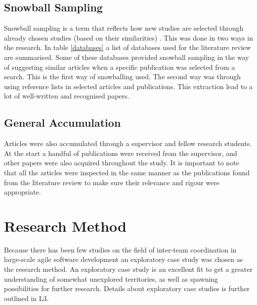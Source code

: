 \subsection{Snowball Sampling}

Snowball sampling is a term that reflects how new studies are selected through already chosen studies (based on their similarities) \cite{Goodman1961}. This was done in two ways in the research. In table \ref{databases} a list of databases used for the literature review are summarised. Some of these databases provided snowball sampling in the way of suggesting similar articles when a specific publication was selected from a search. This is the first way of snowballing used. The second way was through using reference lists in selected articles and publications. This extraction lead to a lot of well-written and recognised papers.

\subsection{General Accumulation}
\label{general}

Articles were also accumulated through a supervisor and fellow research students. At the start a handful of publications were received from the supervisor, and other papers were also acquired throughout the study. It is important to note that all the articles were inspected in the same manner as the publications found from the literature review to make sure their relevance and rigour were appropriate.

\section{Research Method}

Because there has been few studies on the field of inter-team coordination in large-scale agile software development an exploratory case study was chosen as the research method. An exploratory case study is an excellent fit to get a greater understanding of somewhat unexplored territories, as well as spawning possibilities for further research. Details about exploratory case studies is further outlined in L3.

\vspace{0.5cm}


\vspace{0.5cm}

